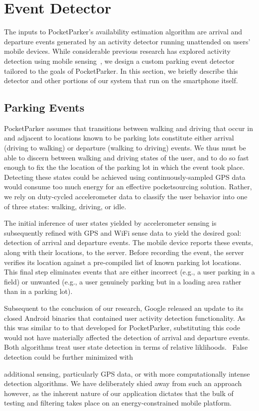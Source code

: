 \section{Event Detector}
\label{sec-detector}

The inputs to PocketParker's availability estimation algorithm are arrival and
departure events generated by an activity detector running unattended on users'
mobile devices.  While considerable previous research has explored activity
detection using mobile sensing~\cite{Constandache:2010:DYS, Keally:2011:PTP,
Reddy:2010:UMP, Yang:2011:DDP, Wang:2009:FEE}, we design a custom parking event
detector tailored to the goals of PocketParker.  In this section, we briefly
describe this detector and other portions of our system that run on the
smartphone itself.  

\subsection{Parking Events}
\label{subsec-goals}

PocketParker assumes that transitions between walking and driving that occur
in and adjacent to locations known to be parking lots constitute either
arrival (driving to walking) or departure (walking to driving) events.  We thus
must be able to discern between walking and driving states of the user, and to 
do so fast enough to fix the the location of the parking lot in which the
event took place.  Detecting these states could be achieved using
continuously-sampled GPS data would consume too much energy for an effective
pocketsourcing solution.  Rather, we rely on duty-cycled accelerometer data to
classify the user behavior into one of three states: walking, driving, or idle.

The initial inference of user states yielded by accelerometer sensing is
subsequently refined with GPS and WiFi sense data to yield the desired goal:
detection of arrival and departure events.  The mobile device reports these
events, along with their locations, to the server.  Before recording the event,
the server verifies its location against a pre-compiled list of known parking
lot locations.  This final step eliminates events that are either
incorrect (e.g., a user parking in a field) or unwanted (e.g., a user genuinely
parking but in a loading area rather than in a parking lot).

Subsequent to the conclusion of our research, Google released an update to its
closed Android binaries that contained user activity detection functionality.
As this was similar to to that developed for PocketParker, substituting this
code would not have materially affected the detection of arrival and departure 
events.  Both algorithms treat user state detection in terms of relative
liklihoods.~\cite{recognition-confidence}  False detection could be further minimized with

additional sensing, particularly GPS data, or with more computationally intense
detection algorithms.  We have deliberately shied away from such an approach
however, as the inherent nature of our application dictates that the bulk of
testing and filtering takes place on an energy-constrained mobile platform.
